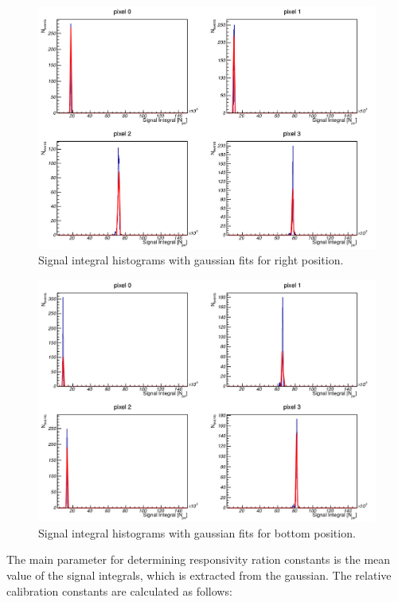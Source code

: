 \begin{figure}[H]
 \centering
 \includegraphics[scale=0.32, angle = 0]{./pictures/right.png}
 \caption{Signal integral histograms with gaussian fits for right position.}
 \label{rightCal}
 
\end{figure}
\begin{figure}[H]
 \centering
 \includegraphics[scale=0.32, angle = 0]{./pictures/bottom.png}
 \caption{Signal integral histograms with gaussian fits for bottom position.}
 \label{bottomCal}
 
\end{figure}


The main parameter for determining responsivity ration constants is the mean value of the signal integrals, which is extracted from the gaussian. The relative calibration constants are calculated as follows:

